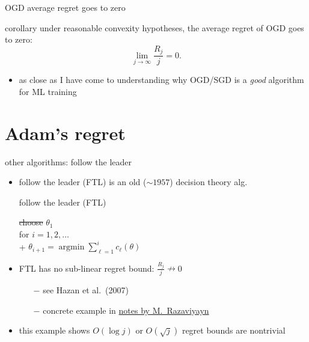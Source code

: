 \documentclass[xcolor={svgnames},
               hyperref={colorlinks,citecolor=DeepPink4,linkcolor=FireBrick,urlcolor=Maroon}]
               {beamer}
\newcommand{\argmin}{\operatorname{argmin}}
\newcommand{\ds}{\displaystyle}
\begin{document}
\begin{frame}{OGD average regret goes to zero}

\begin{block}{corollary}
under reasonable convexity hypotheses, the average regret of OGD goes to zero:
    $$\lim_{j\to\infty} \frac{R_j}{j} = 0.$$
\end{block}

\begin{itemize}
\item as close as I have come to understanding why OGD/SGD is a \emph{good} algorithm for ML training
\end{itemize}
\end{frame}


\section{Adam's regret}

\begin{frame}{other algorithms: follow the leader}

\begin{itemize}
\item follow the leader (FTL) is an old ($\sim 1957$) decision theory alg.

\begin{block}{follow the leader (FTL)}

\begin{pseudo*}
\st{choose} $\theta_1$ \\
for $i = 1,2,\dots$ \\+
    $\ds \theta_{i+1} = \argmin \sum_{\ell=1}^i c_\ell(\theta)$
\end{pseudo*}
\end{block}

\item FTL has no sub-linear regret bound: $\ds \frac{R_j}{j} \nrightarrow 0$
    \begin{itemize}
    \item[$-$] see Hazan et al.~(2007)
    \item[$-$] concrete example in \href{https://cpb-us-e1.wpmucdn.com/sites.usc.edu/dist/3/137/files/2017/02/lec24-2bywoz5.pdf}{notes by M.~Razaviyayn}
    \end{itemize}
\item this example shows $O(\log j)$ or $O(\sqrt{j})$ regret bounds are nontrivial
\end{itemize}
\end{frame}
\end{document}
